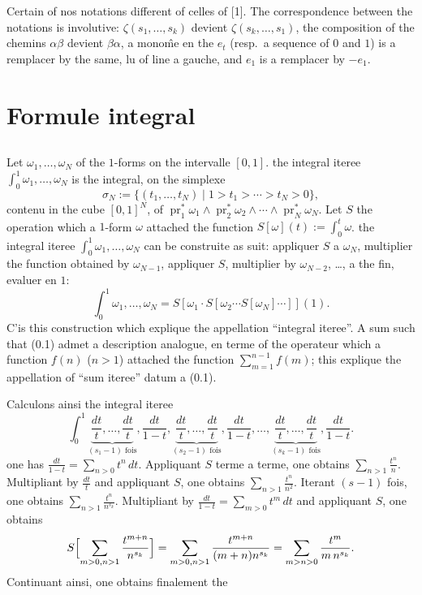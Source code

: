 \documentclass[11pt,a4paper]{article}
\theoremstyle{plain}
\theoremstyle{definition}
\DeclareMathOperator{\pr}{pr}
\begin{document}
Certain of nos notations different of celles of [1]. The correspondence between the notations is involutive: $\zeta(s_1,\ldots,s_k)$ devient $\zeta(s_k,\ldots,s_1)$, the composition of the chemins $\alpha\beta$ devient $\beta\alpha$, a mono\^me en the $e_t$ (resp.~a sequence of $0$ and $1$) is a remplacer by the same, lu of line a gauche, and $e_1$ is a remplacer by $-e_1$.

\section{Formule integral}\label{sec:1}

\subsection{}\label{ssec:1.1}

Let $\omega_1,\ldots,\omega_N$ of the $1$-forms on the intervalle $[0,1]$. the integral iteree $\int_0^1 \omega_1,\ldots,\omega_N$ is the integral, on the simplexe
\begin{equation}\label{eq:1.1.1}
\sigma_N := \{(t_1,\ldots,t_N) \mid 1 > t_1 > \cdots > t_N > 0\},
\end{equation}
contenu in the cube $[0,1]^N$, of $\pr_1^*\omega_1 \wedge \pr_2^*\omega_2 \wedge \cdots \wedge \pr_N^*\omega_N$. Let $S$ the operation which a $1$-form $\omega$ attached the function $S[\omega](t) := \int_0^t \omega$. the integral iteree $\int_0^1 \omega_1,\ldots,\omega_N$ can be construite as suit: appliquer $S$ a $\omega_N$, multiplier the function obtained by $\omega_{N-1}$, appliquer $S$, multiplier by $\omega_{N-2}$, \ldots, a the fin, evaluer en $1$:
\begin{equation}\label{eq:1.1.2}
\int_0^1 \omega_1,\ldots,\omega_N = S[\omega_1 \cdot S[\omega_2 \cdots S[\omega_N]\cdots]](1).
\end{equation}
C'is this construction which explique the appellation ``integral iteree''. A sum such that (0.1) admet a description analogue, en terme of the operateur which a function $f(n)$ ($n > 1$) attached the function $\sum_{m=1}^{n-1} f(m)$; this explique the appellation of ``sum iteree'' datum a (0.1).

Calculons ainsi the integral iteree
\begin{equation}\label{eq:1.1.3}
\int_0^1 \underbrace{\frac{dt}{t},\ldots,\frac{dt}{t}}_{(s_1-1)\text{ fois}}, \frac{dt}{1-t}, \underbrace{\frac{dt}{t},\ldots,\frac{dt}{t}}_{(s_2-1)\text{ fois}}, \frac{dt}{1-t}, \ldots, \underbrace{\frac{dt}{t},\ldots,\frac{dt}{t}}_{(s_k-1)\text{ fois}}, \frac{dt}{1-t}.
\end{equation}
one has $\frac{dt}{1-t} = \sum_{n>0} t^n\,dt$. Appliquant $S$ terme a terme, one obtains $\sum_{n>1} \frac{t^n}{n}$. Multipliant by $\frac{dt}{t}$ and appliquant $S$, one obtains $\sum_{n>1} \frac{t^n}{n^2}$. Iterant $(s-1)$ fois, one obtains $\sum_{n>1} \frac{t^n}{n^{s_k}}$. Multipliant by $\frac{dt}{1-t} = \sum_{m>0} t^m\,dt$ and appliquant $S$, one obtains
\[
S\Bigl[\sum_{m>0,n>1} \frac{t^{m+n}}{n^{s_k}}\Bigr] = \sum_{m>0,n>1} \frac{t^{m+n}}{(m+n)n^{s_k}} = \sum_{m>n>0} \frac{t^m}{m\,n^{s_k}}.
\]
Continuant ainsi, one obtains finalement the
\end{document}
